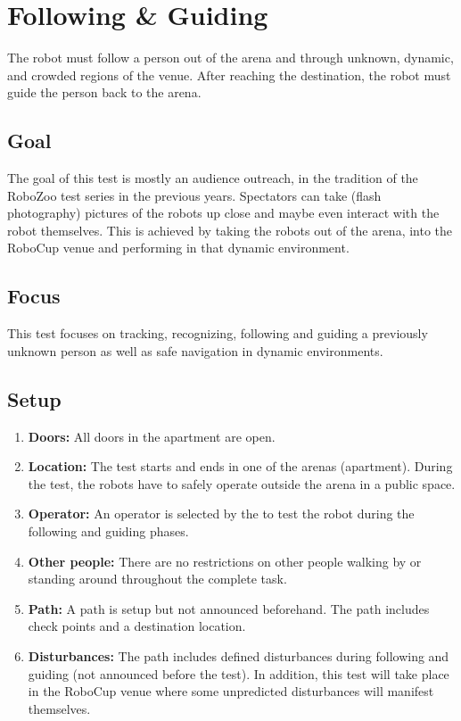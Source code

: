 \section{Following \& Guiding}

The robot must follow a person out of the arena and through unknown, dynamic, and crowded regions of the venue. 
After reaching the destination, the robot must guide the person back to the arena.

\subsection{Goal}
The goal of this test is mostly an audience outreach, in the tradition of the RoboZoo test series in the previous years. 
Spectators can take (flash photography) pictures of the robots up close and maybe even interact with the robot themselves.
This is achieved by taking the robots out of the arena, into the RoboCup venue and performing in that dynamic environment. 

\subsection{Focus}
This test focuses on tracking, recognizing, following and guiding a previously unknown person as well as safe navigation in dynamic environments.

\subsection{Setup}

\begin{enumerate}
\item \textbf{Doors:} All doors in the apartment are open.
\item \textbf{Location:} The test starts and ends in one of the arenas (apartment). During the test, the robots have to safely operate outside the arena in a public space.
\item \textbf{Operator:} An operator is selected by the \TC to test the robot during the following and guiding phases.
\item \textbf{Other people:} There are no restrictions on other people walking by or standing around throughout the complete task.
\item \textbf{Path:} A path is setup but not announced beforehand. 
The path includes check points and a destination location.
\item \textbf{Disturbances:} The path includes defined disturbances during following and guiding (not announced before the test).
In addition, this test will take place in the RoboCup venue where some unpredicted disturbances will manifest themselves. 
\end{enumerate}

